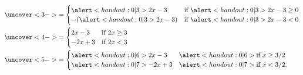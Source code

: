 \begin{frame}
\begin{example}
\begin{columns}
\begin{align*}
{}%
& \uncover<3->{%
 = \begin{cases}
\alert<handout:0| 3>{2x-3} & \text{if $\alert<handout:0| 3>{2x-3} \geq 0$}\\
-(\alert<handout:0| 3>{2x-3}) & \text{if $\alert<handout:0| 3>{2x-3} < 0$}\\
\end{cases}
}\\%
& \uncover<4->{%
 = \begin{cases}
2x-3 & \text{if $2x \geq 3$}\\
-2x+3 & \text{if $2x < 3$}\\
\end{cases}
}\\%
& \uncover<5->{%
 = \begin{cases}
\alert<handout:0| 6>{2x-3} & \alert<handout:0| 6>{\text{if $x \geq 3/2$}}\\
\alert<handout:0| 7>{-2x+3} & \alert<handout:0| 7>{\text{if $x < 3/2$}}.\\
\end{cases}
}%
\end{align*}
\end{columns}
\end{example}
\end{frame}
